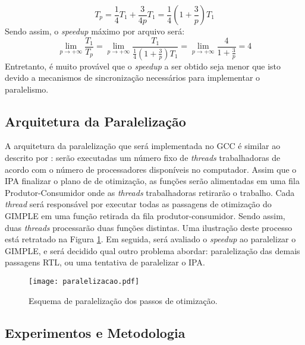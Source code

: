 $$ T_p = \frac{1}{4} T_1 + \frac{3}{4p}T_1 = \frac{1}{4} \left( 1 + \frac{3}{p}
\right)T_1 $$ Sendo assim, o \textit{speedup} máximo por arquivo será: $$
\lim_{p \rightarrow +\infty} \frac{T_1}{T_p} = \lim_{p \rightarrow +\infty}
\frac{T_1}{\frac{1}{4} \left( 1 + \frac{3}{p} \right)T_1} = \lim_{p \rightarrow
+\infty} \frac{4}{1 + \frac{3}{p}} = 4$$
Entretanto, é muito provável que o \textit{speedup} a ser obtido seja menor que isto
devido a mecanismos de sincronização necessários para implementar o paralelismo.

\subsection{Arquitetura da Paralelização}

A arquitetura da paralelização que será implementada no GCC é similar ao
descrito por \cite{wortman1992}: serão executadas um número fixo de
\textit{threads} trabalhadoras de acordo com o número de processadores
disponíveis no computador.
Assim que o IPA finalizar o plano de
de otimização, as funções serão alimentadas em uma fila Produtor-Consumidor
onde as \textit{threads} trabalhadoras retirarão o trabalho.
Cada \textit{thread} será responsável por executar todas as passagens
de otimização do GIMPLE em uma função retirada da fila produtor-consumidor.
Sendo assim, duas \textit{threads} processarão duas funções distintas.
Uma ilustração deste processo está retratado na Figura \ref{fig:paralelizacao}.
Em seguida, será avaliado o \textit{speedup} ao paralelizar o GIMPLE, e
será decidido qual outro problema abordar: paralelização das demais
passagens RTL, ou uma tentativa de paralelizar o IPA.

\begin{figure}[ht]
 \centering
 \texttt{[image: paralelizacao.pdf]}
 \caption{Esquema de paralelização dos passos de otimização.}
 \label{fig:paralelizacao}
\end{figure}
\subsection{Experimentos e Metodologia}

